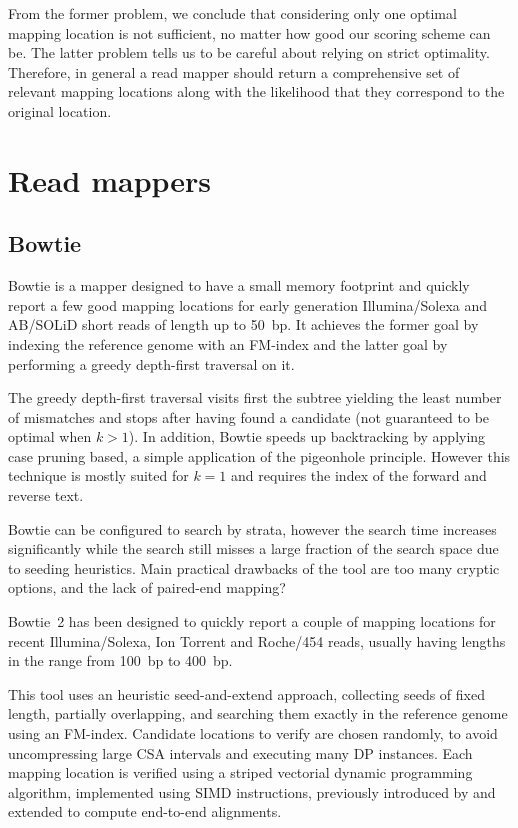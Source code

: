 From the former problem, we conclude that considering only one optimal mapping location is not sufficient, no matter how good our scoring scheme can be.
The latter problem tells us to be careful about relying on strict optimality.
Therefore, in general a read mapper should return a comprehensive set of relevant mapping locations along with the likelihood that they correspond to the original location.


\section{Read mappers}


\subsection{Bowtie}

Bowtie \citep{Bowtie} is a mapper designed to have a small memory footprint and quickly report a few good mapping locations for early generation Illumina/Solexa and AB/SOLiD short reads of length up to 50~bp.
It achieves the former goal by indexing the reference genome with an FM-index and the latter goal by performing a greedy depth-first traversal on it.

The greedy depth-first traversal visits first the subtree yielding the least number of mismatches and stops after having found a candidate (not guaranteed to be optimal when $k>1$).
In addition, Bowtie speeds up backtracking by applying case pruning based, a simple application of the pigeonhole principle.
However this technique is mostly suited for $k=1$ and requires the index of the forward and reverse text.

Bowtie can be configured to search by strata, however the search time increases significantly while the search still misses a large fraction of the search space due to seeding heuristics.
Main practical drawbacks of the tool are too many cryptic options, and the lack of paired-end mapping?

Bowtie~2 \citep{Bowtie2} has been designed to quickly report a couple of mapping locations for recent Illumina/Solexa, Ion Torrent and Roche/454 reads, usually having lengths in the range from 100~bp to 400~bp.

This tool uses an heuristic seed-and-extend approach, collecting seeds of fixed length, partially overlapping, and searching them exactly in the reference genome using an FM-index.
Candidate locations to verify are chosen randomly, to avoid uncompressing large CSA intervals and executing many DP instances.
Each mapping location is verified using a striped vectorial dynamic programming algorithm, implemented using SIMD instructions, previously introduced by \citep{Farrar2007} and extended to compute end-to-end alignments.

